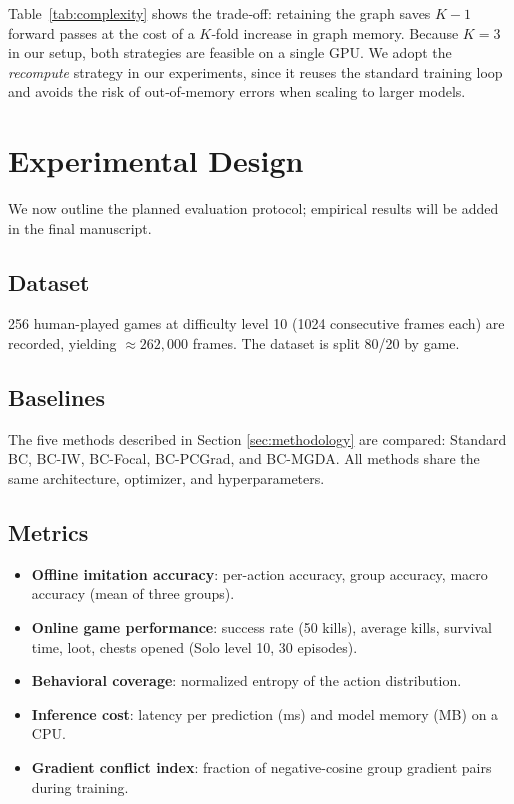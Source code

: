 \documentclass[conference]{IEEEtran}
\begin{document}
Table~\ref{tab:complexity} shows the trade‑off: retaining the graph saves $K-1$ forward passes at the cost of a $K$‑fold increase in graph memory.
Because $K=3$ in our setup, both strategies are feasible on a single GPU.
We adopt the \textit{recompute} strategy in our experiments, since it reuses the standard training loop and avoids the risk of out‑of‑memory errors when scaling to larger models.

\section{Experimental Design}
We now outline the planned evaluation protocol; empirical results will be added in the final manuscript.

\subsection{Dataset}
256 human-played games at difficulty level 10 (1024 consecutive frames each) are recorded, yielding $\approx262{,}000$ frames. The dataset is split 80/20 by game.

\subsection{Baselines}
The five methods described in Section \ref{sec:methodology} are compared: Standard BC, BC-IW, BC-Focal, BC-PCGrad, and BC-MGDA. All methods share the same architecture, optimizer, and hyperparameters.

\subsection{Metrics}
\begin{itemize}
    \item \textbf{Offline imitation accuracy}: per-action accuracy, group accuracy, macro accuracy (mean of three groups).
    \item \textbf{Online game performance}: success rate (50 kills), average kills, survival time, loot, chests opened (Solo level 10, 30 episodes).
    \item \textbf{Behavioral coverage}: normalized entropy of the action distribution.
    \item \textbf{Inference cost}: latency per prediction (ms) and model memory (MB) on a CPU.
    \item \textbf{Gradient conflict index}: fraction of negative-cosine group gradient pairs during training.
\end{itemize}
\end{document}
